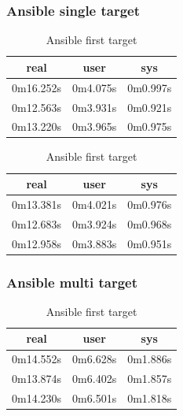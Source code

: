 \documentclass[10pt,]{report}
\begin{document}
\begin{adjustwidth}{20pt}{}
	\subsubsection{Ansible single target}
	\begin{table}[H]
		\caption{Ansible first target}
		\begin{center}
			\begin{tabular}[c]{|c|c|c|}
				\hline
				\multicolumn{1}{|c|}{\textbf{real}} &
				\multicolumn{1}{c|}{\textbf{user}}  &
				\multicolumn{1}{c|}{\textbf{sys}}                         \\
				\hline
				0m16.252s                           & 0m4.075s & 0m0.997s \\
				\hline
				0m12.563s                           & 0m3.931s & 0m0.921s \\
				\hline
				0m13.220s                           & 0m3.965s & 0m0.975s \\
				\hline
			\end{tabular}
		\end{center}
	\end{table}
	\vspace{-5mm}
	\begin{table}[H]
		\caption{Ansible first target}
		\begin{center}
			\begin{tabular}[c]{|c|c|c|}
				\hline
				\multicolumn{1}{|c|}{\textbf{real}} &
				\multicolumn{1}{c|}{\textbf{user}}  &
				\multicolumn{1}{c|}{\textbf{sys}}                         \\
				\hline
				0m13.381s                           & 0m4.021s & 0m0.976s \\
				\hline
				0m12.683s                           & 0m3.924s & 0m0.968s \\
				\hline
				0m12.958s                           & 0m3.883s & 0m0.951s \\
				\hline
			\end{tabular}
		\end{center}
	\end{table}
	\subsubsection{Ansible multi target}
	\begin{table}[H]
		\caption{Ansible first target}
		\begin{center}
			\begin{tabular}[c]{|c|c|c|}
				\hline
				\multicolumn{1}{|c|}{\textbf{real}} &
				\multicolumn{1}{c|}{\textbf{user}}  &
				\multicolumn{1}{c|}{\textbf{sys}}                         \\
				\hline
				0m14.552s                           & 0m6.628s & 0m1.886s \\
				\hline
				0m13.874s                           & 0m6.402s & 0m1.857s \\
				\hline
				0m14.230s                           & 0m6.501s & 0m1.818s \\
				\hline
			\end{tabular}
		\end{center}
	\end{table}

\end{adjustwidth}
\end{document}
